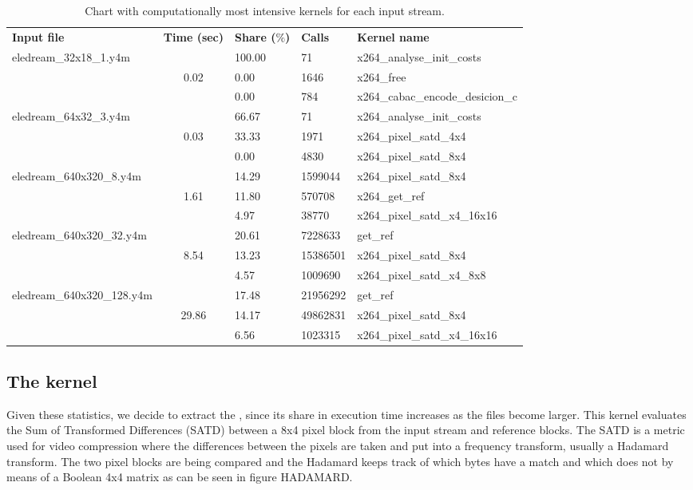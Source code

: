 \begin{table}[htb]%
\centering
\small
	\begin{tabular}{lclll}
		\centering
		\bf{Input file} & \bf{Time (sec)} 	& \bf{Share ($\%$)} & \bf{Calls}	& \bf{Kernel name} \\ \cline{1-5}
		\multirow{3}{*}{eledream\_32x18\_1.y4m}	&				& 100.00	& 71		&	x264\_analyse\_init\_costs\\ 
																						&	0.02	& 0.00 		& 1646	&	x264\_free\\ 
																						&				& 0.00		& 784		&	x264\_cabac\_encode\_desicion\_c\\ \cline{1-5}
		\multirow{3}{*}{eledream\_64x32\_3.y4m} & 			& 66.67		& 71		& x264\_analyse\_init\_costs\\
																						&	0.03	& 33.33 	& 1971	&	x264\_pixel\_satd\_4x4\\ 
																						&				& 0.00		& 4830	&	x264\_pixel\_satd\_8x4\\ \cline{1-5}
		\multirow{3}{*}{eledream\_640x320\_8.y4m}	& 			& 14.29	& 1599044		&	x264\_pixel\_satd\_8x4\\ 
																							&	1.61	& 11.80 	& 570708	&	x264\_get\_ref\\ 
																							&				& 4.97		& 38770		&	x264\_pixel\_satd\_x4\_16x16\\ \cline{1-5}
		\multirow{3}{*}{eledream\_640x320\_32.y4m}& 			& 20.61		& 7228633		&	get\_ref\\ 
																							& 8.54	& 13.23 	& 15386501	&	x264\_pixel\_satd\_8x4\\ 
																							&				& 4.57		& 1009690		&	x264\_pixel\_satd\_x4\_8x8\\ \cline{1-5}
		\multirow{3}{*}{eledream\_640x320\_128.y4m}&			& 17.48		& 21956292	&	get\_ref\\
																							&	 29.86& 14.17 	& 49862831	&	x264\_pixel\_satd\_8x4\\
																							&				& 6.56		& 1023315		&	x264\_pixel\_satd\_x4\_16x16\\ \cline{1-5}
	\end{tabular}	
\caption{Chart with computationally most intensive kernels for each input stream.}
\label{tab:chart}
\end{table}

\subsection{The  kernel}
Given these statistics, we decide to extract the , since its share in execution time increases as the files become larger. This kernel evaluates the Sum of Transformed Differences (SATD) between a 8x4 pixel block from the input stream and reference blocks. The SATD is a metric used for video compression where the differences between the pixels are taken and put into a frequency transform, usually a Hadamard transform. The two pixel blocks are being compared and the Hadamard keeps track of which bytes have a match and which does not by means of a Boolean 4x4 matrix as can be seen in figure HADAMARD.


